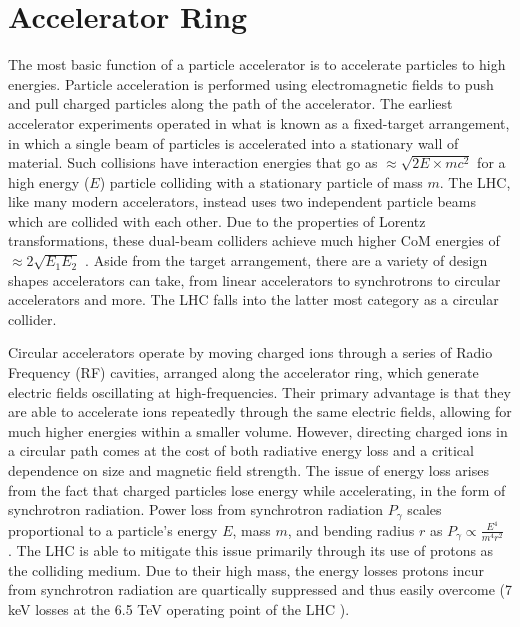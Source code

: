 \section{Accelerator Ring}
    The most basic function of a particle accelerator is to accelerate particles to high energies.
    Particle acceleration is performed using electromagnetic fields to push and pull charged particles along the path of the accelerator.
    The earliest accelerator experiments operated in what is known as a fixed-target arrangement, in which a single beam of particles is accelerated into a stationary wall of material.
    Such collisions have interaction energies that go as $\approx \sqrt{2 E \times m c^2}$ for a high energy ($E$) particle colliding with a stationary particle of mass $m$.
    The LHC, like many modern accelerators, instead uses two independent particle beams which are collided with each other.
    Due to the properties of Lorentz transformations, these dual-beam colliders achieve much higher CoM energies of $\approx 2 \sqrt{E_1 E_2}$ \cite{modern_and_future_colliders}.
    Aside from the target arrangement, there are a variety of design shapes accelerators can take, from linear accelerators to synchrotrons to circular accelerators and more.
    The LHC falls into the latter most category as a circular collider.

    Circular accelerators operate by moving charged ions through a series of Radio Frequency (RF) cavities, arranged along the accelerator ring, which generate electric fields oscillating at high-frequencies.
    Their primary advantage is that they are able to accelerate ions repeatedly through the same electric fields, allowing for much higher energies within a smaller volume.
    However, directing charged ions in a circular path comes at the cost of both radiative energy loss and a critical dependence on size and magnetic field strength.
    The issue of energy loss arises from the fact that charged particles lose energy while accelerating, in the form of synchrotron radiation.
    Power loss from synchrotron radiation $P_\gamma$ scales proportional to a particle's energy $E$, mass $m$, and bending radius $r$ as $P_\gamma \propto \frac{E^4}{m^4 r^2}$ \cite{2007_Book_ParticleAcceleratorPhysics}.
    The LHC is able to mitigate this issue primarily through its use of protons as the colliding medium.
    Due to their high mass, the energy losses protons incur from synchrotron radiation are quartically suppressed and thus easily overcome (7 keV losses at the 6.5 TeV operating point of the LHC \cite{lhc_machine}). %

